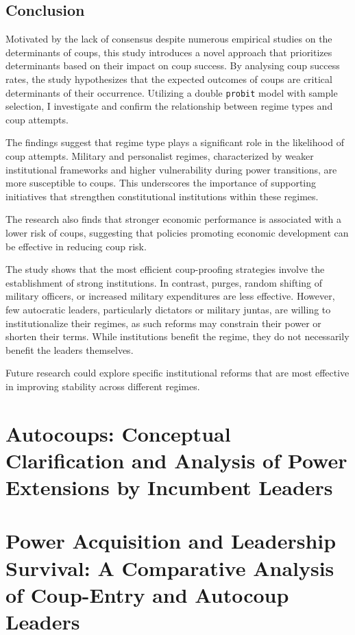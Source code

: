\documentclass[
  12pt,
]{report}
\begin{document}
\section{Conclusion}\label{conclusion}

Motivated by the lack of consensus despite numerous empirical studies on
the determinants of coups, this study introduces a novel approach that
prioritizes determinants based on their impact on coup success. By
analysing coup success rates, the study hypothesizes that the expected
outcomes of coups are critical determinants of their occurrence.
Utilizing a double \texttt{probit} model with sample selection, I
investigate and confirm the relationship between regime types and coup
attempts.

The findings suggest that regime type plays a significant role in the
likelihood of coup attempts. Military and personalist regimes,
characterized by weaker institutional frameworks and higher
vulnerability during power transitions, are more susceptible to coups.
This underscores the importance of supporting initiatives that
strengthen constitutional institutions within these regimes.

The research also finds that stronger economic performance is associated
with a lower risk of coups, suggesting that policies promoting economic
development can be effective in reducing coup risk.

The study shows that the most efficient coup-proofing strategies involve
the establishment of strong institutions. In contrast, purges, random
shifting of military officers, or increased military expenditures are
less effective. However, few autocratic leaders, particularly dictators
or military juntas, are willing to institutionalize their regimes, as
such reforms may constrain their power or shorten their terms. While
institutions benefit the regime, they do not necessarily benefit the
leaders themselves.

Future research could explore specific institutional reforms that are
most effective in improving stability across different regimes.

\chapter{Autocoups: Conceptual Clarification and Analysis of Power
Extensions by Incumbent
Leaders}\label{autocoups-conceptual-clarification-and-analysis-of-power-extensions-by-incumbent-leaders}

\chapter{Power Acquisition and Leadership Survival: A Comparative
Analysis of Coup-Entry and Autocoup
Leaders}\label{power-acquisition-and-leadership-survival-a-comparative-analysis-of-coup-entry-and-autocoup-leaders}
\end{document}
